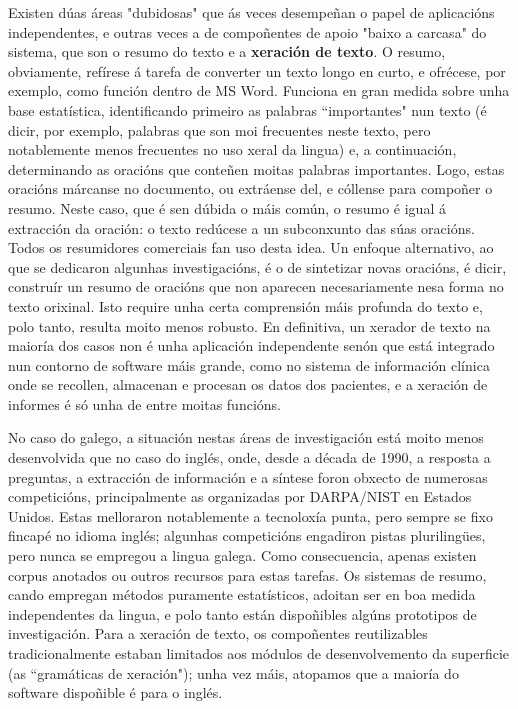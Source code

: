 \begin{multicols}{2}

Existen dúas áreas "dubidosas" que ás veces desempeñan o papel de aplicacións independentes, e outras veces a de compoñentes de apoio "baixo a carcasa" do sistema, que son o resumo do texto e a \textbf{xeración de texto}. O resumo, obviamente, refírese á tarefa de converter un texto longo en curto, e ofrécese, por exemplo, como función dentro de MS Word. Funciona en gran medida sobre unha base estatística, identificando primeiro as palabras “importantes" nun texto (é dicir, por exemplo, palabras que son moi frecuentes neste texto, pero notablemente menos frecuentes no uso xeral da lingua) e, a continuación, determinando as oracións que conteñen moitas palabras importantes. Logo, estas oracións márcanse no documento, ou extráense del, e cóllense para compoñer o resumo. Neste caso, que é sen dúbida o máis común, o resumo é igual á extracción da oración: o texto redúcese a un subconxunto das súas oracións. Todos os resumidores comerciais fan uso desta idea. Un enfoque alternativo, ao que se dedicaron algunhas investigacións, é o de sintetizar novas oracións, é dicir, construír un resumo de oracións que non aparecen necesariamente nesa forma no texto orixinal. Isto require unha certa comprensión máis profunda do texto e, polo tanto, resulta moito menos robusto. En definitiva, un xerador de texto na maioría dos casos non é unha aplicación independente senón que está integrado nun contorno de software máis grande, como no sistema de información clínica onde se recollen, almacenan e procesan os datos dos pacientes, e a xeración de informes é só unha de entre moitas funcións.


No caso do galego, a situación nestas áreas de investigación está moito menos desenvolvida que no caso do inglés, onde, desde a década de 1990, a resposta a preguntas, a extracción de información e a síntese foron obxecto de numerosas competicións, principalmente as organizadas por DARPA/NIST en Estados Unidos. Estas melloraron notablemente a tecnoloxía punta, pero sempre se fixo fincapé no idioma inglés; algunhas competicións engadiron pistas plurilingües, pero nunca se empregou a lingua galega. Como consecuencia, apenas existen corpus anotados ou outros recursos para estas tarefas. Os sistemas de resumo, cando empregan métodos puramente estatísticos, adoitan ser en boa medida independentes da lingua, e polo tanto están dispoñibles algúns prototipos de investigación. Para a xeración de texto, os compoñentes reutilizables tradicionalmente estaban limitados aos módulos de desenvolvemento da superficie (as “gramáticas de xeración"); unha vez máis, atopamos que a maioría do software dispoñible é para o inglés. 


\end{multicols}
